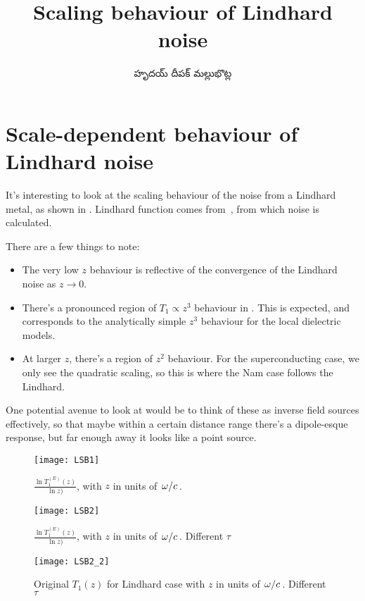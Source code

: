 \documentclass[../main.tex]{subfiles}
\title{Scaling behaviour of Lindhard noise}
\author{\begin{telugu}హృదయ్ దీపక్ మల్లుభొట్ల\end{telugu}}
\date{}
\begin{document}
	\graphicspath{{\main/figures/}}

	\onlyinsubfile{\maketitle}

	\section{Scale-dependent behaviour of Lindhard noise} \label{sec:lsb:intro}

	It's interesting to look at the scaling behaviour of the noise from a Lindhard metal, as shown in .
	Lindhard function comes from~\cite{SolyomV3}, from which noise is calculated.

	There are a few things to note:
	\begin{itemize}
		\item The very low $z$ behaviour is reflective of the convergence of the Lindhard noise as $z \rightarrow 0$.
		\item There's a pronounced region of $T_1 \propto z^3$ behaviour in .
			This is expected, and corresponds to the analytically simple $z^3$ behaviour for the local dielectric models.
		\item At larger $z$, there's a region of $z^2$ behaviour.
			For the superconducting case, we only see the quadratic scaling, so this is where the Nam case follows the Lindhard.
	\end{itemize}

	One potential avenue to look at would be to think of these as inverse field sources effectively, so that maybe within a certain distance range there's a dipole-esque response, but far enough away it looks like a point source.

	\begin{figure}[htp]
		\centering
		\texttt{[image: LSB1]}
		\caption{$\frac{\ln{T_{1}^{(E)}(z)}}{\ln{z})}$, with $z$ in units of $\flatfrac{\omega}{c}$.}\label{fig:lsb:scale1}
	\end{figure}

	\begin{figure}[htp]
		\centering
		\texttt{[image: LSB2]}
		\caption{$\frac{\ln{T_{1}^{(E)}(z)}}{\ln{z})}$, with $z$ in units of $\flatfrac{\omega}{c}$.
		Different $\tau$}\label{fig:lsb:scale2}
	\end{figure}

	\begin{figure}[htp]
		\centering
		\texttt{[image: LSB2\_2]}
		\caption{Original $T_1(z)$ for Lindhard case with $z$ in units of $\flatfrac{\omega}{c}$.
		Different $\tau$}\label{fig:lsb:scale2.2}
	\end{figure}
\end{document}
